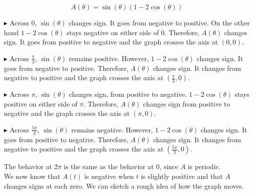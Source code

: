 \documentclass{ximera}
\begin{document}
\[   A(\theta) = \sin(\theta) (1 - 2\cos(\theta))   \]



\begin{explanation}

$\blacktriangleright$  Across $0$, $\sin(\theta)$ changes sign. It goes from negative to positive. On the other hand $1 - 2\cos(\theta)$ stays negative on either side of $0$.  Therefore, $A(\theta)$ changes sign.  It goes from positive to negative and the graph crosses the axis at $(0, 0)$.

$\blacktriangleright$  Across $\frac{\pi}{3}$, $\sin(\theta)$ remains positive. However, $1 - 2\cos(\theta)$ changes sign.  It goes from negative to positive. Therefore, $A(\theta)$ changes sign. It changes from negative to positive and the graph crosses the axis at $\left( \frac{\pi}{3}, 0 \right)$.


$\blacktriangleright$  Across $\pi$, $\sin(\theta)$ changes sign, from positive to negative.  $1 - 2\cos(\theta)$ stays positive on either side of $\pi$.  Therefore, $A(\theta)$ changes sign from positive to negative and the graph crosses the axis at $(\pi, 0)$.


$\blacktriangleright$  Across $\frac{5\pi}{3}$, $\sin(\theta)$ remains negative. However, $1 - 2\cos(\theta)$ changes sign.  It goes from positive to negative. Therefore, $A(\theta)$ changes sign. It changes from negative to positive and the graph crosses the axis at $\left( \frac{5\pi}{3}, 0 \right)$.



\end{explanation}






The behavior at $2\pi$ is the same as the behavior at $0$, since $A$ is periodic. \\





We now know that $A(t)$ is negative when $t$ is slightly positive and that $A$ changes signs at each zero. We can sketch a rough idea of how the graph moves.
\end{document}

